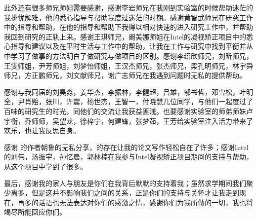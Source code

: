 \begin{ack}
此外还有很多师兄师姐需要感谢，感谢李岩师兄在我刚到实验室的时候帮助迷茫的我排忧解难，他的悉心指导与帮助我度过迷茫的时期。感谢黄智武师兄在研究工作中的指导和帮助，在他的指导和帮助下我得以相对快速的进入研究工作中，并帮助我回到研究的正轨上来。感谢王琪师兄，阚美娜师姐在Intel的凝视矫正项目中的悉心指导和建议以及在平时生活与工作中的帮助，让我在工作与研究中找到平衡并从中学习了做事的方法明白了做研究与做项目的区别。感谢李绍欣师兄，刘昕师兄，王雯师姐，尹芳师姐，刘梦怡师姐，王汉杰师兄，张杰师兄，梁孔明师兄，林宇舜师兄，方正鹏师兄，刘文献师兄，谢广志师兄在我遇到问题时无私的提供帮助。

感谢与我同届的刘昊淼，姜华杰，李振林，李健超，吕雄，邬书哲，邓雪松，叶明全，尹肖贻，张川，许震，杨世杰，王智一，付晓慧几位同学，与他们一起度过了百味的研究生的时光，同他们的交流让我获益匪浅。也要感谢实验室的师弟师妹卢宇衡，乔师师，吴望龙，徐梓宁，何建锋，张梦茹，王芳给实验室注入活力带来了欢乐，也让我反思自身。

感谢 \ucasthesis 的作者朝鲁的无私分享，\ucasthesis 的存在让我的论文写作轻松自在了许多；感谢Intel的刘伟，汤振宇，孙忆晨，郭林楠在我参与Intel凝视矫正项目期间的支持与帮助，从这个项目中学到了很多。

最后，感谢我的家人与朋友是你们在我背后默默的支持着我；虽然求学期间我们聚少离多，但是这并不影响我们之间的关系，正是你们的支持与关怀才让我走到现在，再多的话语也无法表达对你们的感激之情，感谢你们为我所做的一切，我也将竭尽所能回应你们。
\end{ack}
